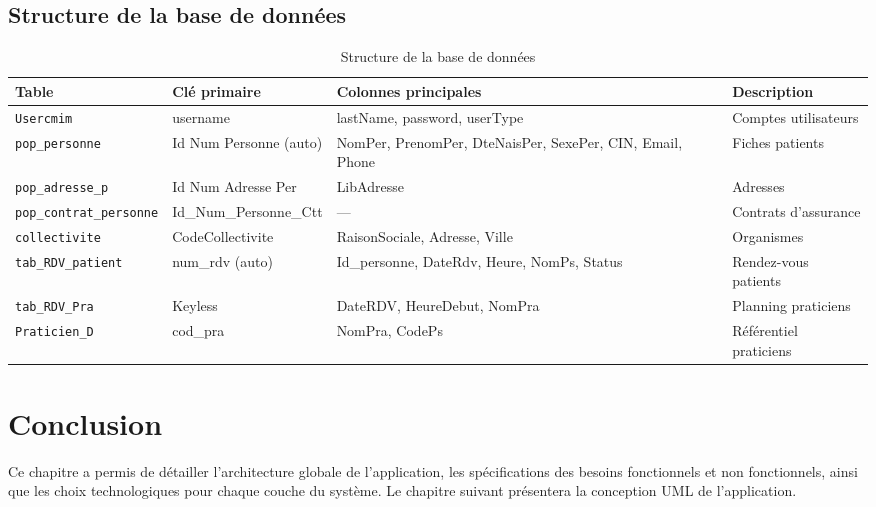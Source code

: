 \subsection{Structure de la base de données}

\begin{table}[H]
\centering
\caption{Structure de la base de données}
\label{tab:bdd}
\begin{tabular}{@{} l l p{5.5cm} p{3.5cm} @{}}
\toprule
\textbf{Table} & \textbf{Clé primaire} & \textbf{Colonnes principales} & \textbf{Description} \\
\midrule
\texttt{Usercmim} & username & lastName, password, userType & Comptes utilisateurs \\
\texttt{pop\_personne} & Id Num Personne (auto) & NomPer, PrenomPer, DteNaisPer, SexePer, CIN, Email, Phone & Fiches patients \\
\texttt{pop\_adresse\_p} & Id Num Adresse Per & LibAdresse & Adresses \\
\texttt{pop\_contrat\_personne} & Id\_Num\_Personne\_Ctt & --- & Contrats d'assurance \\
\texttt{collectivite} & CodeCollectivite & RaisonSociale, Adresse, Ville & Organismes \\
\texttt{tab\_RDV\_patient} & num\_rdv (auto) & Id\_personne, DateRdv, Heure, NomPs, Status & Rendez-vous patients \\
\texttt{tab\_RDV\_Pra} & Keyless & DateRDV, HeureDebut, NomPra & Planning praticiens \\
\texttt{Praticien\_D} & cod\_pra & NomPra, CodePs & Référentiel praticiens \\
\bottomrule
\end{tabular}
\end{table}

\section{Conclusion}

Ce chapitre a permis de détailler l'architecture globale de l'application, les spécifications des besoins fonctionnels et non fonctionnels, ainsi que les choix technologiques pour chaque couche du système. Le chapitre suivant présentera la conception UML de l'application.

